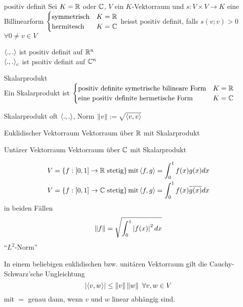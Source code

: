 \begin{Def}{positiv definit}
  Sei $K=\mathbb{R}$ oder $\mathbb{C}$, $V$ ein $K$-Vektorraum und $s:V\times V\to K$ eine Billinearform $\begin{cases}
    \text{symmetrisch} & K= \mathbb{R} \\
    \text{hermitesch} & K=\mathbb{C}
  \end{cases}$
  heisst positiv definit, falls $s(v;v)>0$ $\forall 0 \neq v\in V$
\end{Def}
\begin{Bsp}
  $\left\langle .,. \right\rangle$ ist positiv definit auf $\mathbb{R}^n$\\
  $\left\langle .,. \right\rangle_c$ ist psoitiv definit auf $\mathbb{C}^n$
\end{Bsp}
\begin{Def}{Skalarprodukt}
  \\Ein Skalarprodukt ist $ \begin{cases}
    \text{positiv definite symetrische bilineare Form} & K=\mathbb{R}\\
    \text{eine positiv definite hermetische Form} & K=\mathbb{C}
  \end{cases}$ 
\end{Def}
\begin{Def}
  Skalarprodukt oft $\left\langle .,. \right\rangle$, Norm $\left\| v \right\| := \sqrt{\left\langle v,v \right\rangle}$
\end{Def}
\begin{Def}{Euklidischer Vektorraum}
  Vektorraum über $\mathbb{R}$ mit Skalarprodukt
\end{Def}
\begin{Def}{Untärer Vektorraum}
  Vektorraum über $\mathbb{C}$ mit Skalarprodukt
\end{Def}
\begin{Bsp}
  \begin{align*}
    V=\left\{ f:[0,1]\to\mathbb{R}\ \text{stetig} \right\} \text{mit} \left\langle f,g \right\rangle=\int_0^1f(x)g(x)dx\\
    V=\left\{ f:[0,1]\to\mathbb{C}\ \text{stetig} \right\} \text{mit} \left\langle f,g \right\rangle=\int_0^1f(x)\overline{g(x)}dx
  \end{align*}
  in beiden Fällen
  \[\left\| f \right\|=\sqrt{\int_0^1\left| f(x) \right|^2dx}\]
  ``$L^2$-Norm''
\end{Bsp}
\begin{Bem}
  In einem beliebigen euklidischen bzw. unitären Vektorraum gilt die Cauchy-Schwarz'sche Ungleichtung
  \[\left| \left\langle v,w \right\rangle \right|\leq \left\| v \right\|\left\| w \right\|\ \forall v,w\in V\]
  mit $=$ genau dann, wenn $v$ und $w$ linear abhängig sind.
\end{Bem}
